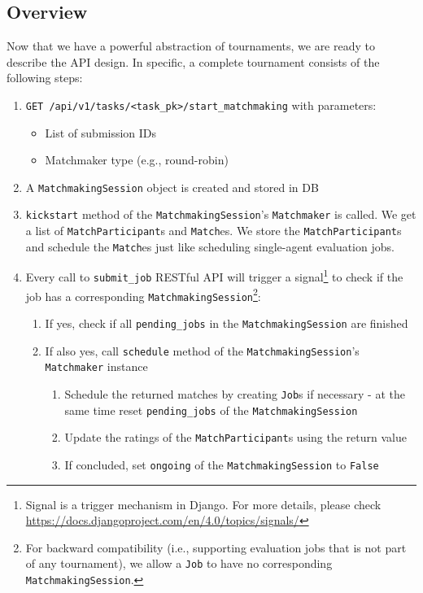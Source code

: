\subsection{Overview}
\label{as:matchmaking-api_design-overview}
Now that we have a powerful abstraction of tournaments, we are ready to describe the API design. In specific, a complete tournament consists of the following steps:
\begin{enumerate}
    \item \texttt{GET /api/v1/tasks/<task\_pk>/start\_matchmaking} with parameters:
    \begin{itemize}
        \item List of submission IDs
        \item Matchmaker type (e.g., round-robin)
    \end{itemize}
    \item A \texttt{MatchmakingSession} object is created and stored in DB
    \item \texttt{kickstart} method of the \texttt{MatchmakingSession}'s \texttt{Matchmaker} is called. We get a list of \texttt{MatchParticipant}s and \texttt{Match}es. We store the \texttt{MatchParticipant}s and schedule the \texttt{Match}es just like scheduling single-agent evaluation jobs.
    \item Every call to \texttt{submit\_job} RESTful API will trigger a signal\footnote{Signal is a trigger mechanism in Django. For more details, please check \href{https://docs.djangoproject.com/en/4.0/topics/signals/}{https://docs.djangoproject.com/en/4.0/topics/signals/}} to check if the job has a corresponding \texttt{MatchmakingSession}\footnote{For backward compatibility (i.e., supporting evaluation jobs that is not part of any tournament), we allow a \texttt{Job} to have no corresponding \texttt{MatchmakingSession}.}:
    \begin{enumerate}
        \item If yes, check if all \texttt{pending\_jobs} in the \texttt{MatchmakingSession} are finished
        \item If also yes, call \texttt{schedule} method of the \texttt{MatchmakingSession}'s \texttt{Matchmaker} instance
        \begin{enumerate}
            \item Schedule the returned matches by creating \texttt{Job}s if necessary - at the same time reset \texttt{pending\_jobs} of the \texttt{MatchmakingSession}
            \item Update the ratings of the \texttt{MatchParticipant}s using the return value
            \item If concluded, set \texttt{ongoing} of the \texttt{MatchmakingSession} to \texttt{False}
        \end{enumerate}
    \end{enumerate}
\end{enumerate}

